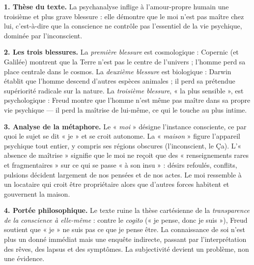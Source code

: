\documentclass[11pt]{article}
\begin{document}
\begin{corrige}
\textbf{1. Thèse du texte.} La psychanalyse inflige à l'amour-propre humain une troisième et plus grave blessure : elle démontre que le moi n'est pas maître chez lui, c'est-à-dire que la conscience ne contrôle pas l'essentiel de la vie psychique, dominée par l'inconscient.

\textbf{2. Les trois blessures.} La \emph{première blessure} est cosmologique : Copernic (et Galilée) montrent que la Terre n'est pas le centre de l'univers ; l'homme perd sa place centrale dans le cosmos. La \emph{deuxième blessure} est biologique : Darwin établit que l'homme descend d'autres espèces animales ; il perd sa prétendue supériorité radicale sur la nature. La \emph{troisième blessure}, « la plus sensible », est psychologique : Freud montre que l'homme n'est même pas maître dans sa propre vie psychique — il perd la maîtrise de lui-même, ce qui le touche au plus intime.

\textbf{3. Analyse de la métaphore.} Le « \emph{moi} » désigne l'instance consciente, ce par quoi le sujet se dit « je » et se croit autonome. La « \emph{maison} » figure l'appareil psychique tout entier, y compris ses régions obscures (l'inconscient, le Ça). L'« absence de maîtrise » signifie que le moi ne reçoit que des « renseignements rares et fragmentaires » sur ce qui se passe « à son insu » : désirs refoulés, conflits, pulsions décident largement de nos pensées et de nos actes. Le moi ressemble à un locataire qui croit être propriétaire alors que d'autres forces habitent et gouvernent la maison.

\textbf{4. Portée philosophique.} Le texte ruine la thèse cartésienne de la \emph{transparence de la conscience à elle-même} : contre le \emph{cogito} (« je pense, donc je suis »), Freud soutient que « je » ne suis pas ce que je pense être. La connaissance de soi n'est plus un donné immédiat mais une enquête indirecte, passant par l'interprétation des rêves, des lapsus et des symptômes. La subjectivité devient un problème, non une évidence.


\end{corrige}
\end{document}
